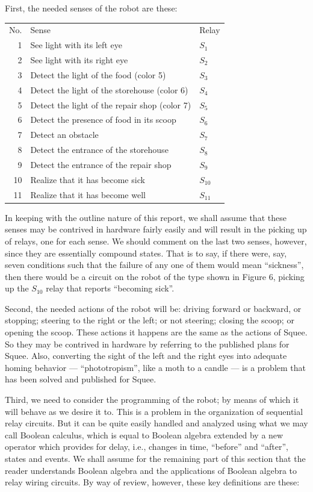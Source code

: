 \documentclass[11pt]{article}
\begin{document}
First, the needed senses of the robot are these:

\begin{tabularx}{0.96\textwidth}{@{}r Y >{\RaggedLeft\arraybackslash}p{0.08\textwidth}@{}}
No. & Sense & Relay \\
1 & See light with its left eye & $S_1$ \\
2 & See light with its right eye & $S_2$ \\
3 & Detect the light of the food (color 5) & $S_3$ \\
4 & Detect the light of the storehouse (color 6) & $S_4$ \\
5 & Detect the light of the repair shop (color 7) & $S_5$ \\
6 & Detect the presence of food in its scoop & $S_6$ \\
7 & Detect an obstacle & $S_7$ \\
8 & Detect the entrance of the storehouse & $S_8$ \\
9 & Detect the entrance of the repair shop & $S_9$ \\
10 & Realize that it has become sick & $S_{10}$ \\
11 & Realize that it has become well & $S_{11}$ \\
\end{tabularx}

In keeping with the outline nature of this report, we shall assume that these
senses may be contrived in hardware fairly easily and will result in the
picking up of relays, one for each sense. We should comment on the last two
senses, however, since they are essentially compound states. That is to say, if
there were, say, seven conditions such that the failure of any one of them
would mean ``sickness'', then there would be a circuit on the robot of the type
shown in Figure 6, picking up the $S_{10}$ relay that reports ``becoming
sick''.

Second, the needed actions of the robot will be: driving forward or backward,
or stopping; steering to the right or the left; or not steering; closing the
scoop; or opening the scoop. These actions it happens are the same as the
actions of Squee. So they may be contrived in hardware by referring to the
published plans for Squee. Also, converting the sight of the left and the right
eyes into adequate homing behavior --- ``phototropism'', like a moth to a
candle --- is a problem that has been solved and published for Squee.

Third, we need to consider the programming of the robot; by means of which it
will behave as we desire it to. This is a problem in the organization of
sequential relay circuits. But it can be quite easily handled and analyzed
using what we may call Boolean calculus, which is equal to Boolean algebra
extended by a new operator which provides for delay, i.e., changes in time,
``before'' and ``after'', states and events. We shall assume for the remaining
part of this section that the reader understands Boolean algebra and the
applications of Boolean algebra to relay wiring circuits. By way of review,
however, these key definitions are these:
\end{document}
